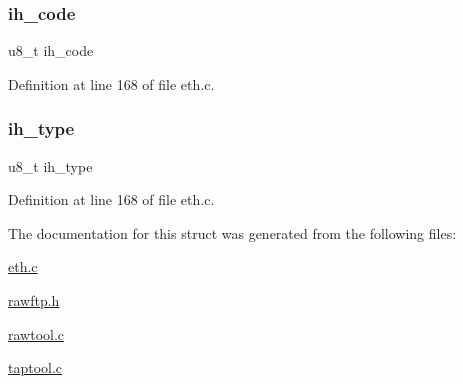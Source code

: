 \subsubsection{\texorpdfstring{ih\+\_\+code}{ih\_code}}
{\footnotesize\ttfamily u8\+\_\+t ih\+\_\+code}



Definition at line 168 of file eth.\+c.

\hypertarget{struct__icmp__hdr_aca1c40ab9e76627712fef1a463f8035a}{}\label{struct__icmp__hdr_aca1c40ab9e76627712fef1a463f8035a} 
\subsubsection{\texorpdfstring{ih\+\_\+type}{ih\_type}}
{\footnotesize\ttfamily u8\+\_\+t ih\+\_\+type}



Definition at line 168 of file eth.\+c.



The documentation for this struct was generated from the following files\+:\begin{DoxyCompactItemize}
\item 
\hyperlink{eth_8c}{eth.\+c}\item 
\hyperlink{rawftp_8h}{rawftp.\+h}\item 
\hyperlink{rawtool_8c}{rawtool.\+c}\item 
\hyperlink{taptool_8c}{taptool.\+c}\end{DoxyCompactItemize}

